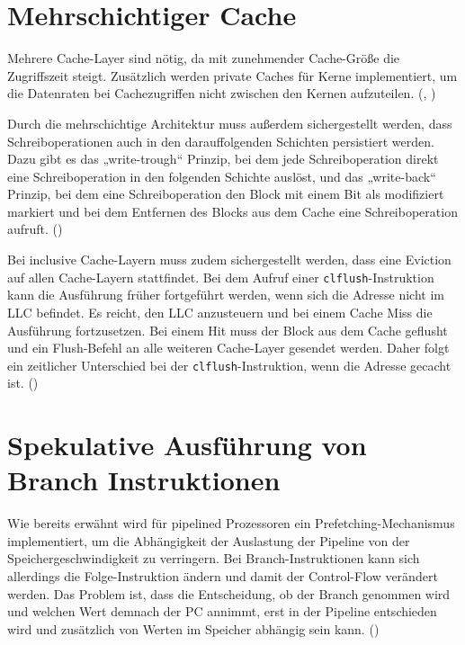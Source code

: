 \section{Mehrschichtiger Cache}
\label{appendix:multilayer-cache}
Mehrere Cache-Layer sind nötig, da mit zunehmender Cache-Größe
die Zugriffszeit steigt.
Zusätzlich werden private Caches für Kerne implementiert, um die
Datenraten bei Cachezugriffen nicht zwischen den Kernen
aufzuteilen.
(\cite[388]{slomka_grundlagen_2023}, \cite[593]{sarangi_basic_2021})

Durch die mehrschichtige Architektur muss außerdem sichergestellt
werden, dass Schreiboperationen auch in den darauffolgenden
Schichten persistiert werden. Dazu gibt es das „write-trough“
Prinzip, bei dem jede Schreiboperation direkt eine
Schreiboperation in den folgenden Schichte auslöst, und das
„write-back“ Prinzip, bei dem eine Schreiboperation den Block
mit einem Bit als modifiziert markiert und bei dem Entfernen
des Blocks aus dem Cache eine Schreiboperation aufruft.
(\cite[526]{sarangi_basic_2021})

Bei inclusive Cache-Layern muss zudem sichergestellt werden,
dass eine Eviction auf allen Cache-Layern stattfindet. Bei dem
Aufruf einer \verb|clflush|-Instruktion kann die Ausführung
früher fortgeführt werden, wenn sich die Adresse nicht im
\ac{LLC} befindet. Es reicht, den \ac{LLC} anzusteuern und bei
einem Cache Miss die Ausführung fortzusetzen. Bei einem Hit muss
der Block aus dem Cache geflusht und ein Flush-Befehl an alle
weiteren Cache-Layer gesendet werden. Daher folgt ein zeitlicher
Unterschied bei der \verb|clflush|-Instruktion, wenn die Adresse
gecacht ist. (\cite[4]{caballero_flushflush_2016})

\section{Spekulative Ausführung von Branch Instruktionen}
\label{appendix:speculative-branches}
Wie bereits erwähnt wird für pipelined Prozessoren ein
Prefetching-Mechanismus implementiert, um die Abhängigkeit der
Auslastung der Pipeline von der Speichergeschwindigkeit zu
verringern. Bei Branch-Instruktionen kann sich allerdings
die Folge-Instruktion ändern und damit der Control-Flow verändert
werden. Das Problem ist, dass die Entscheidung, ob der Branch
genommen wird und welchen Wert demnach der \ac{PC} annimmt, erst
in der Pipeline entschieden wird und zusätzlich von Werten im
Speicher abhängig sein kann.
(\cite[14,15,40]{kaeli_speculative_2005})

